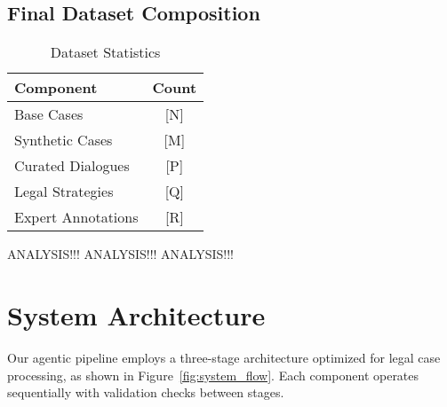 \subsection{Final Dataset Composition}
\begin{table}[h]
    \centering
    \caption{Dataset Statistics}
    \label{tab:dataset_stats}
    \begin{tabular}{lc}
        \toprule
        \textbf{Component} & \textbf{Count} \\
        \midrule
        Base Cases & [N] \\
        Synthetic Cases & [M] \\
        Curated Dialogues & [P] \\
        Legal Strategies & [Q] \\
        Expert Annotations & [R] \\
        \bottomrule
    \end{tabular}
\end{table}

ANALYSIS!!!
ANALYSIS!!!
ANALYSIS!!!
\section{System Architecture}
\label{sec:architecture}

Our agentic pipeline employs a three-stage architecture optimized for legal case processing, as shown in Figure~\ref{fig:system_flow}. Each component operates sequentially with validation checks between stages.

